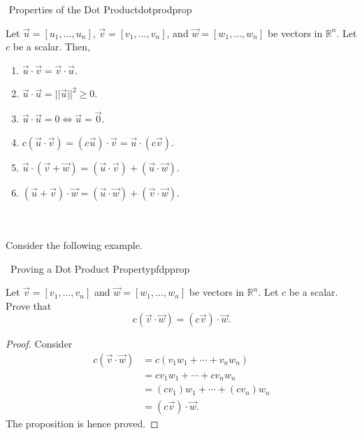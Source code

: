         \begin{theorem}{\Stop\,\,Properties of the Dot Product}{dotprodprop}
    
            Let \(\vec{u}=[u_1,\ldots,u_n]\), \(\vec{v}=[v_1,\ldots,v_n]\), and \(\vec{w}=[w_1,\ldots,w_n]\) be vectors in \(\mathbb{R}^n\). Let \(c\) be a scalar. Then,
            \begin{enumerate}
                \item \(\vec{u}\cdot\vec{v}=\vec{v}\cdot\vec{u}\).
                \item \(\vec{u}\cdot\vec{u}=||\vec{u}||^2\geq0\).
                \item \(\vec{u}\cdot\vec{u}=0\iff\vec{u}=\vec{0}\).
                \item \(c(\vec{u}\cdot\vec{v})=(c\vec{u})\cdot\vec{v}=\vec{u}\cdot(c\vec{v})\).
                \item \(\vec{u}\cdot(\vec{v}+\vec{w})=(\vec{u}\cdot\vec{v})+(\vec{u}\cdot\vec{w})\).
                \item \((\vec{u}+\vec{v})\cdot\vec{w}=(\vec{u}\cdot\vec{w})+(\vec{v}\cdot\vec{w})\).
            \end{enumerate}
        
        \end{theorem}
        \pagebreak
        \vphantom
        \\
        \\
        Consider the following example.
        \begin{example}{\Difficulty\,\Difficulty\,\,Proving a Dot Product Property}{pfdpprop}
                
            Let \(\vec{v}=[v_1,\ldots,v_n]\) and \(\vec{w}=[w_1,\ldots,w_n]\) be vectors in \(\mathbb{R}^n\). Let \(c\) be a scalar. Prove that
            \begin{equation*}
                c(\vec{v}\cdot\vec{w})=(c\vec{v})\cdot\vec{w}.
            \end{equation*}
            \begin{proof}
                Consider
                \begin{align*}
                     c(\vec{v}\cdot\vec{w})&=c(v_1w_1+\cdots+v_nw_n) \\
                     &=cv_1w_1+\cdots+cv_nw_n \\
                     &=(cv_1)w_1+\cdots+(cv_n)w_n \\
                     &=(c\vec{v})\cdot\vec{w}.
                \end{align*}
                The proposition is hence proved.
            \end{proof}
        
        \end{example}
